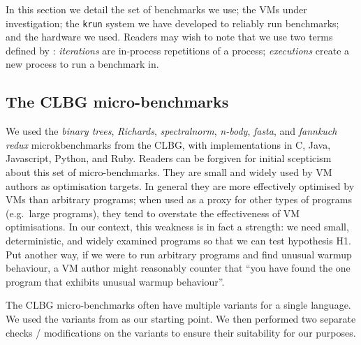 \documentclass[10pt,preprint]{sigplanconf}
\newcommand{\krun}{\texttt{krun}\xspace}
\newcommand{\hypone}{H1\xspace}
\newcommand{\binarytrees}{\emph{binary trees}\xspace}
\newcommand{\richards}{\emph{Richards}\xspace}
\newcommand{\spectralnorm}{\emph{spectralnorm}\xspace}
\newcommand{\nbody}{\emph{n-body}\xspace}
\newcommand{\fasta}{\emph{fasta}\xspace}
\newcommand{\fannkuch}{\emph{fannkuch redux}\xspace}
\begin{document}
In this section we detail the set of benchmarks we use; the VMs under
investigation; the \krun system we have developed to reliably run benchmarks;
and the hardware we used. Readers may wish to note that we use two terms defined
by \cite{kalibera13rigorous}: \emph{iterations} are in-process repetitions of a
process; \emph{executions} create a new process to run a benchmark in.


\subsection{The CLBG micro-benchmarks}

We used the \binarytrees, \richards, \spectralnorm, \nbody, \fasta, and
\fannkuch microkbenchmarks from the CLBG, with implementations in C, Java,
Javascript, Python, and Ruby. Readers can be forgiven for initial scepticism
about this set of micro-benchmarks. They are small and widely
used by VM authors as optimisation targets. In general they are more effectively
optimised by VMs than arbitrary programs; when used as a proxy for other types
of programs (e.g.~large programs), they tend to overstate the effectiveness of
VM optimisations. In our context, this weakness is in fact a strength: we need
small, deterministic, and widely examined programs so that we can test
hypothesis \hypone. Put another way, if we were to run arbitrary programs
and find unusual warmup behaviour, a VM author might reasonably counter that
``you have found the one program that exhibits unusual warmup behaviour''.

The CLBG micro-benchmarks often have multiple variants for a single language. We
used the variants from \cite{bolz14impact} as our starting point. We then
performed two separate checks / modifications on the variants to ensure their
suitability for our purposes.
\end{document}
